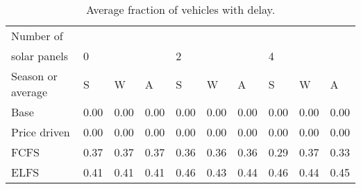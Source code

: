 \begin{table}[h]
\centering
\begin{tabular}{l|lll|lll|lll}Number of \\ solar panels&0& & &2& & &4& & \\ \hline
Season or average & S & W & A & S & W & A & S & W & A \\ \hline
Base&0.00&0.00&0.00&0.00&0.00&0.00&0.00&0.00&0.00 \\
Price driven&0.00&0.00&0.00&0.00&0.00&0.00&0.00&0.00&0.00 \\
FCFS&0.37&0.37&0.37&0.36&0.36&0.36&0.29&0.37&0.33 \\
ELFS&0.41&0.41&0.41&0.46&0.43&0.44&0.46&0.44&0.45 \\
\end{tabular}
\caption{Average fraction of vehicles with delay.}
\label{avg frac del}
\end{table}
